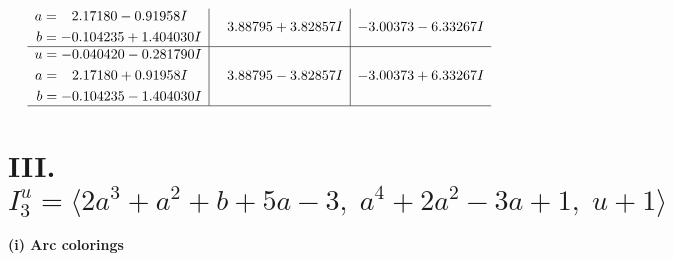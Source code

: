 \documentclass[1p]{elsarticle_modified}
\theoremstyle{definition}
\begin{document}
$$\begin{array}{c|c|c}
\begin{aligned}
a &= \phantom{-}2.17180 - 0.91958 I \\
b &= -0.104235 + 1.404030 I\end{aligned}
 & \phantom{-}3.88795 + 3.82857 I & -3.00373 - 6.33267 I \\ \hline\begin{aligned}
u &= -0.040420 - 0.281790 I \\
a &= \phantom{-}2.17180 + 0.91958 I \\
b &= -0.104235 - 1.404030 I\end{aligned}
 & \phantom{-}3.88795 - 3.82857 I & -3.00373 + 6.33267 I\\
 \hline 
 \end{array}$$\newpage\newpage\renewcommand{\arraystretch}{1}
\centering \section*{III. $I^u_{3}= \langle 2 a^3+a^2+b+5 a-3,\;a^4+2 a^2-3 a+1,\;u+1 \rangle$}
\flushleft \textbf{(i) Arc colorings}\\
\end{document}

